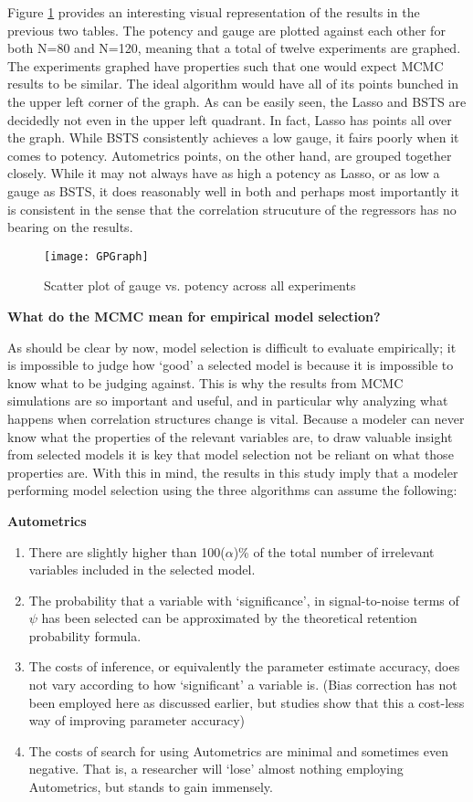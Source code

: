 \documentclass[11pt, oneside]{book}   	%
\begin{document}
Figure \ref{fig:GaugePot} provides an interesting visual representation of the results in the previous two tables. The potency and gauge are plotted against each other for both N=80 and N=120, meaning that a total of twelve experiments are graphed. The experiments graphed have properties such that one would expect MCMC results to be similar. The ideal algorithm would have all of its points bunched in the upper left corner of the graph. As can be easily seen, the Lasso and BSTS are decidedly not even in the upper left quadrant. In fact, Lasso has points all over the graph. While BSTS consistently achieves a low gauge, it fairs poorly when it comes to potency. Autometrics points, on the other hand, are grouped together closely. While it may not always have as high a potency as Lasso, or as low a gauge as BSTS, it does reasonably well in both and perhaps most importantly it is consistent in the sense that the correlation strucuture of the regressors has no bearing on the results. 

\begin{figure}[h]


\centering
\texttt{[image: GPGraph]}
\caption{Scatter plot of gauge vs. potency across all experiments}
\label{fig:GaugePot}


\end{figure}


\textbf{What do the MCMC mean for empirical model selection?}

As should be clear by now, model selection is difficult to evaluate empirically; it is impossible to judge how `good' a selected model is because it is impossible to know what to be judging against. This is why the results from MCMC simulations are so important and useful, and in particular why analyzing what happens when correlation structures change is vital. Because a modeler can never know what the properties of the relevant variables are, to draw valuable insight from selected models it is key that model selection not be reliant on what those properties are. With this in mind, the results in this study imply that a modeler performing model selection using the three algorithms can assume the following:

\textbf{Autometrics}
\begin{enumerate}
\item There are slightly higher than 100($\alpha$)\% of the total number of irrelevant variables included in the selected model. 
\item The probability that a variable with `significance', in signal-to-noise terms of $\psi$ has been selected can be approximated by the theoretical retention probability formula.
\item The costs of inference, or equivalently the parameter estimate accuracy, does not vary according to how `significant' a variable is. (Bias correction has not been employed here as discussed earlier, but studies show that this a cost-less way of improving parameter accuracy)
\item The costs of search for using Autometrics are minimal and sometimes even negative. That is, a researcher will `lose' almost nothing employing Autometrics, but stands to gain immensely.
\end{enumerate}
\end{document}
